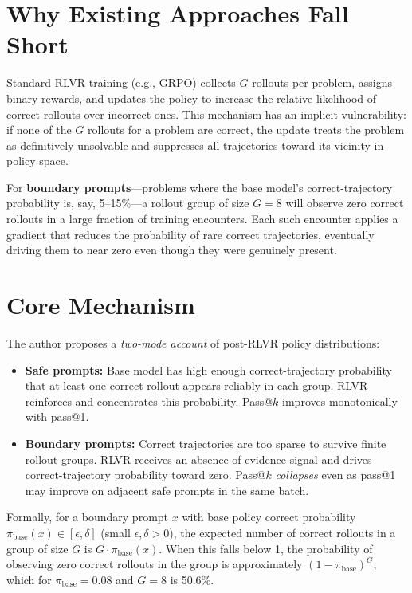 \documentclass[10pt,twocolumn]{article}
\begin{document}
\section{Why Existing Approaches Fall Short}

Standard RLVR training (e.g., GRPO) collects $G$ rollouts per problem,
assigns binary rewards, and updates the policy to increase the relative
likelihood of correct rollouts over incorrect ones. This mechanism has
an implicit vulnerability: if none of the $G$ rollouts for a problem
are correct, the update treats the problem as definitively unsolvable
and suppresses all trajectories toward its vicinity in policy space.

For \textbf{boundary prompts}---problems where the base model's
correct-trajectory probability is, say, 5--15\%---a rollout group of
size $G = 8$ will observe zero correct rollouts in a large fraction
of training encounters. Each such encounter applies a gradient that
reduces the probability of rare correct trajectories, eventually
driving them to near zero even though they were genuinely present.

\section{Core Mechanism}

The author proposes a \emph{two-mode account} of post-RLVR policy
distributions:

\begin{itemize}[itemsep=2pt,parsep=0pt]
  \item \textbf{Safe prompts:} Base model has high enough
    correct-trajectory probability that at least one correct rollout
    appears reliably in each group. RLVR reinforces and concentrates
    this probability. Pass@$k$ improves monotonically with pass@1.
  \item \textbf{Boundary prompts:} Correct trajectories are too sparse
    to survive finite rollout groups. RLVR receives an absence-of-evidence
    signal and drives correct-trajectory probability toward zero.
    Pass@$k$ \emph{collapses} even as pass@1 may improve on adjacent
    safe prompts in the same batch.
\end{itemize}

Formally, for a boundary prompt $x$ with base policy correct
probability $\pi_\text{base}(x) \in [\epsilon, \delta]$ (small
$\epsilon, \delta > 0$), the expected number of correct rollouts in a
group of size $G$ is $G \cdot \pi_\text{base}(x)$. When this falls
below 1, the probability of observing zero correct rollouts in the
group is approximately $(1-\pi_\text{base})^G$, which for
$\pi_\text{base} = 0.08$ and $G = 8$ is 50.6\%.
\end{document}
